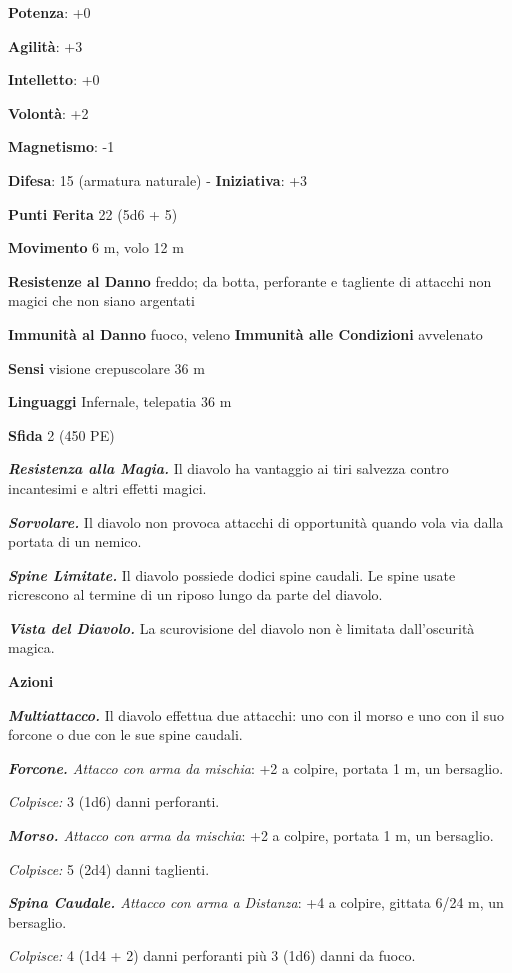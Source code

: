 \begin{multicols}{2}
\textbf{Potenza}: +0

\textbf{Agilità}: +3

\textbf{Intelletto}: +0

\textbf{Volontà}: +2

\textbf{Magnetismo}: -1

\textbf{Difesa}: 15 (armatura naturale) - \textbf{Iniziativa}: +3

\textbf{Punti Ferita} 22 (5d6 + 5)

\textbf{Movimento} 6 m, volo 12 m

\textbf{Resistenze al Danno} freddo; da botta, perforante e tagliente
di attacchi non magici che non siano argentati

\textbf{Immunità al Danno} fuoco, veleno \textbf{Immunità alle
Condizioni} avvelenato

\textbf{Sensi} visione crepuscolare 36 m

\textbf{Linguaggi} Infernale, telepatia 36 m 

\textbf{Sfida} 2 (450 PE)\smallskip

\emph{\textbf{Resistenza alla Magia.}} Il diavolo ha vantaggio ai tiri
salvezza contro incantesimi e altri effetti magici.

\emph{\textbf{Sorvolare.}} Il diavolo non provoca attacchi di
opportunità quando vola via dalla portata di un nemico.

\emph{\textbf{Spine Limitate.}} Il diavolo possiede dodici spine
caudali. Le spine usate ricrescono al termine di un riposo lungo da
parte del diavolo.

\emph{\textbf{Vista del Diavolo.}} La scurovisione del diavolo non è
limitata dall'oscurità magica.

\smallskip\textbf{Azioni}

\emph{\textbf{Multiattacco.}} Il diavolo effettua due attacchi: uno con
il morso e uno con il suo forcone o due con le sue spine caudali.

\emph{\textbf{Forcone.} Attacco con arma da mischia}: +2 a colpire,
portata 1 m, un bersaglio.

\emph{Colpisce:} 3 (1d6) danni perforanti.

\emph{\textbf{Morso.} Attacco con arma da mischia}: +2 a colpire,
portata 1 m, un bersaglio.

\emph{Colpisce:} 5 (2d4) danni taglienti.

\emph{\textbf{Spina Caudale.} Attacco con arma a Distanza}: +4 a
colpire, gittata 6/24 m, un bersaglio.

\emph{Colpisce:} 4 (1d4 + 2) danni perforanti più 3 (1d6) danni da
fuoco.


\end{multicols}
